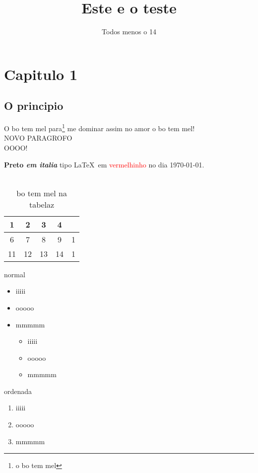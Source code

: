 \documentclass[11pt, a4paper, oneside]{article}
\title{Este e o teste}
\author{Todos menos o 14}
\begin{document}
\maketitle
\newpage


\section{Capitulo 1}
\subsection{O principio }
O bo tem mel para\footnote{o bo tem mel} me dominar assim no amor o bo tem mel!\\
 NOVO PARAGROFO\\
OOOO!\\


\begin{comment}o grande comentario da actualidade\end{comment}


\textbf{Preto \textit{em italia}} tipo \LaTeX\ em \textcolor{red}{vermelhinho} no dia \today.
\\
\\

\begin{table}[!h]
\caption{bo tem mel na tabelaz}
\scalebox{3.5}

\begin{tabular}{| c | c | c | c | c |}
\hline

1 & 2 & 3 & 4 & \\ \hline

6 & 7 & 8 & 9 &1\\ \hline

11&12 &13 &14 &1\\ \hline

\end{tabular}
\end{table}



normal
\begin{itemize}
\item iiiii
\item ooooo
\item mmmmm
\begin{itemize}
\item iiiii
\item ooooo
\item mmmmm
\end{itemize}
\end{itemize}

ordenada

\begin{enumerate}
\item iiiii
\item ooooo
\item mmmmm
\end{enumerate}
\end{document}
